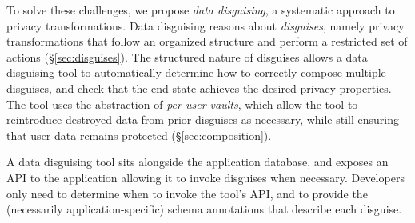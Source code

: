 
To solve these challenges, we propose \emph{data disguising}, a systematic approach to privacy
transformations. Data disguising reasons about \emph{disguises}, namely privacy transformations that
follow an organized structure and perform a restricted set of actions (\S\ref{sec:disguises}). 
The structured nature of disguises allows a data disguising tool to automatically determine how to correctly
compose multiple disguises, and check that the end-state achieves the desired privacy properties.
The tool uses the abstraction of \emph{per-user vaults}, which allow the tool to
reintroduce destroyed data from prior disguises as necessary, while still ensuring that user data
remains protected (\S\ref{sec:composition}). 

A data disguising tool sits alongside the application database, and exposes an API to the
application allowing it to invoke disguises when necessary. Developers only need to determine when
to invoke the tool's API, and to provide the (necessarily application-specific) schema annotations
that describe each disguise.
